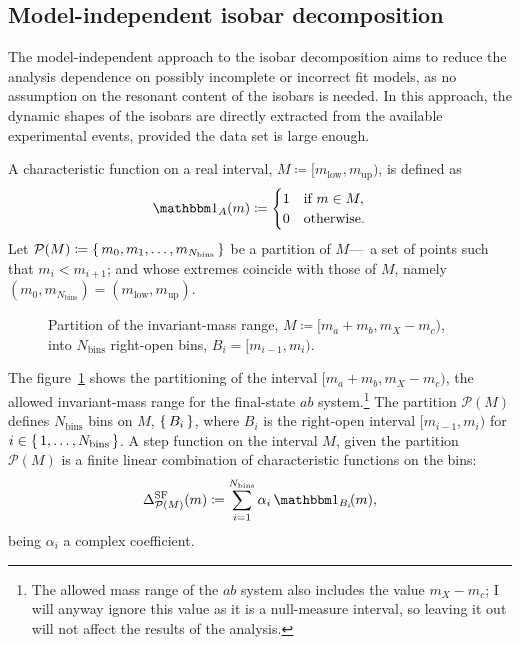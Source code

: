 \subsection{Model-independent isobar decomposition}
\label{sec:model_independent_isobar_decomposition}

    The model-independent approach to the isobar decomposition aims to reduce the analysis dependence on possibly incomplete or incorrect fit models, as no assumption on the resonant content of the isobars is needed.
    In this approach, the dynamic shapes of the isobars are directly extracted from the available experimental events, provided the data set is large enough.
    

    A characteristic function on a real interval, $M \coloneqq [m_{\text{low}}, m_{\text{up}})$, is defined as
    \begin{equation}
        \Characteristic_A(m) \coloneqq 
        \begin{cases}
            1 &\text{if }m \in M, \\
            0 &\text{otherwise}.
        \end{cases}
    \end{equation}
    Let $\mathcal{P}(M) \coloneqq \set{m_0, m_1,\dots, m_{N_\text{bins}}}$ be a partition of $M$---\ie~a set of points such that $m_{i} < m_{i+1}$; and whose extremes coincide with those of $M$, namely $(m_0, m_{N_\text{bins}}) = (m_{\text{low}}, m_{\text{up}})$.
    \begin{figure}
        \centering
        
        \caption[Partition of the invariant-mass range into $N_\text{bins}$ right-open bins.]%
        {Partition of the invariant-mass range, $M \coloneqq [m_a+m_b,m_X - m_c)$, into $N_\text{bins}$ right-open bins, $B_i = [m_{i-1}, m_i)$.}
        \label{fig:invariant-mass-partition}
    \end{figure}
    The figure~\ref{fig:invariant-mass-partition} shows the partitioning of the interval $[m_a+m_b,m_X-m_c)$, the allowed invariant-mass range for the final-state $ab$ system.\footnote{The allowed mass range of the $ab$ system also includes the value $m_X - m_c$; I will anyway ignore this value as it is a null-measure interval, so leaving it out will not affect the results of the analysis.}
    The partition $\mathcal{P}(M)$ defines $N_\text{bins}$ bins on $M$, $\set{B_i}$, where $B_i$ is the right-open interval $[m_{i-1},m_i)$ for $i\in\set{1,\dots, N_\text{bins}}$.
    A step function on the interval $M$, given the partition $\mathcal{P}(M)$ is a finite linear combination of characteristic functions on the bins:
    \begin{equation}\label{eq:step_dynamic_shape}
        \Delta_{\mathcal{P}(M)}^{\text{SF}}(m) \coloneqq \sum_{i = 1}^{N_\text{bins}} \alpha_i\, \Characteristic_{B_i}\!(m),
    \end{equation}
    being $\alpha_i$ a complex coefficient.


